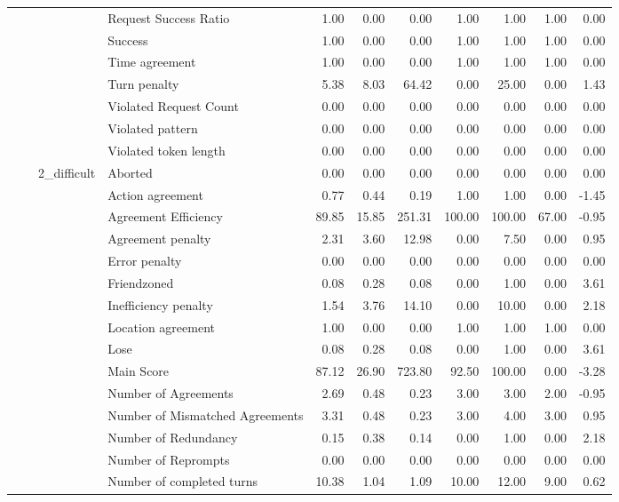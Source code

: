 \begin{tabular}{llllrrrrrrr}
 &  &  & Request Success Ratio & 1.00 & 0.00 & 0.00 & 1.00 & 1.00 & 1.00 & 0.00 \\
 &  &  & Success & 1.00 & 0.00 & 0.00 & 1.00 & 1.00 & 1.00 & 0.00 \\
 &  &  & Time agreement & 1.00 & 0.00 & 0.00 & 1.00 & 1.00 & 1.00 & 0.00 \\
 &  &  & Turn penalty & 5.38 & 8.03 & 64.42 & 0.00 & 25.00 & 0.00 & 1.43 \\
 &  &  & Violated Request Count & 0.00 & 0.00 & 0.00 & 0.00 & 0.00 & 0.00 & 0.00 \\
 &  &  & Violated pattern & 0.00 & 0.00 & 0.00 & 0.00 & 0.00 & 0.00 & 0.00 \\
 &  &  & Violated token length & 0.00 & 0.00 & 0.00 & 0.00 & 0.00 & 0.00 & 0.00 \\
\cline{3-11}
 &  & \multirow[t]{27}{*}{2_difficult} & Aborted & 0.00 & 0.00 & 0.00 & 0.00 & 0.00 & 0.00 & 0.00 \\
 &  &  & Action agreement & 0.77 & 0.44 & 0.19 & 1.00 & 1.00 & 0.00 & -1.45 \\
 &  &  & Agreement Efficiency & 89.85 & 15.85 & 251.31 & 100.00 & 100.00 & 67.00 & -0.95 \\
 &  &  & Agreement penalty & 2.31 & 3.60 & 12.98 & 0.00 & 7.50 & 0.00 & 0.95 \\
 &  &  & Error penalty & 0.00 & 0.00 & 0.00 & 0.00 & 0.00 & 0.00 & 0.00 \\
 &  &  & Friendzoned & 0.08 & 0.28 & 0.08 & 0.00 & 1.00 & 0.00 & 3.61 \\
 &  &  & Inefficiency penalty & 1.54 & 3.76 & 14.10 & 0.00 & 10.00 & 0.00 & 2.18 \\
 &  &  & Location agreement & 1.00 & 0.00 & 0.00 & 1.00 & 1.00 & 1.00 & 0.00 \\
 &  &  & Lose & 0.08 & 0.28 & 0.08 & 0.00 & 1.00 & 0.00 & 3.61 \\
 &  &  & Main Score & 87.12 & 26.90 & 723.80 & 92.50 & 100.00 & 0.00 & -3.28 \\
 &  &  & Number of Agreements & 2.69 & 0.48 & 0.23 & 3.00 & 3.00 & 2.00 & -0.95 \\
 &  &  & Number of Mismatched Agreements & 3.31 & 0.48 & 0.23 & 3.00 & 4.00 & 3.00 & 0.95 \\
 &  &  & Number of Redundancy & 0.15 & 0.38 & 0.14 & 0.00 & 1.00 & 0.00 & 2.18 \\
 &  &  & Number of Reprompts & 0.00 & 0.00 & 0.00 & 0.00 & 0.00 & 0.00 & 0.00 \\
 &  &  & Number of completed turns & 10.38 & 1.04 & 1.09 & 10.00 & 12.00 & 9.00 & 0.62 \\

\end{tabular}
